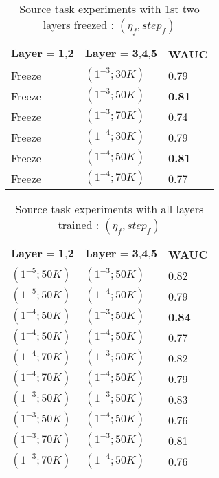 \begin{table}[H]
\label{tab:a5}
\centering
\begin{tabular}{| p{} | p{}| p{}| }
\hline
$\textbf{Layer = 1,2}$ & $\textbf{Layer = 3,4,5}$ & \textbf{WAUC}\\
\hline
Freeze & $(1^{-3}; 30K)$ & 0.79\\
\hline
Freeze & $(1^{-3}; 50K)$ & \textbf{0.81}\\
\hline
Freeze & $(1^{-3}; 70K)$ & 0.74\\
\hline
Freeze & $(1^{-4}; 30K)$ & 0.79\\
\hline
Freeze & $(1^{-4}; 50K)$ & \textbf{0.81}\\
\hline
Freeze & $(1^{-4}; 70K)$ & 0.77\\
\hline
\end{tabular}
\caption{Source task experiments with 1st two layers freezed : $(\eta_{f}, {step}_{f})$} 
\end{table}

\begin{table}[H]
\label{tab:a6}
\centering
\begin{tabular}{| p{} | p{}| p{}| }
\hline
$\textbf{Layer = 1,2}$ & $\textbf{Layer = 3,4,5}$ & \textbf{WAUC}\\
\hline
$(1^{-5}; 50K)$ & $(1^{-3}; 50K)$ & 0.82\\
\hline
$(1^{-5}; 50K)$ & $(1^{-4}; 50K)$ & 0.79\\
\hline
$(1^{-4}; 50K)$ & $(1^{-3}; 50K)$ & \textbf{0.84}\\
\hline
$(1^{-4}; 50K)$ & $(1^{-4}; 50K)$ & 0.77\\
\hline
$(1^{-4}; 70K)$ & $(1^{-3}; 50K)$ & 0.82\\
\hline
$(1^{-4}; 70K)$ & $(1^{-4}; 50K)$ & 0.79\\
\hline
$(1^{-3}; 50K)$ & $(1^{-3}; 50K)$ & 0.83\\
\hline
$(1^{-3}; 50K)$ & $(1^{-4}; 50K)$ & 0.76\\
\hline
$(1^{-3}; 70K)$ & $(1^{-3}; 50K)$ & 0.81\\
\hline
$(1^{-3}; 70K)$ & $(1^{-4}; 50K)$ & 0.76\\
\hline
\end{tabular}
\caption{Source task experiments with all layers trained : $(\eta_{f}, {step}_{f})$}
\end{table}

